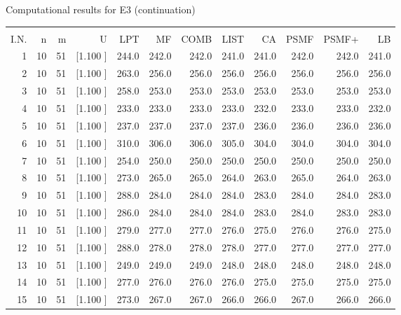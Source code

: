 \documentclass[12pt,a4paper]{article}
\begin{document}
\newpage
\begin{center}
 Computational results for E3 (continuation) {\tiny
\begin{tabular}{r r r r r r r r r r r r}\hline
    &   &   &          &        &        &        &        &        &        &        &       \\[-0.1in]
  I.N.  &  n  &  m  &  U  &  LPT  &  MF  &  COMB  &  LIST  &  CA  & PSMF &PSMF+ & LB \\[0.03in]
\hline
   1& 10& 51&[1.100     ]&   244.0&   242.0&   242.0&   241.0&   241.0&   242.0&   242.0&   241.0\\[-0.02in]
   2& 10& 51&[1.100     ]&   263.0&   256.0&   256.0&   256.0&   256.0&   256.0&   256.0&   256.0\\[-0.02in]
   3& 10& 51&[1.100     ]&   258.0&   253.0&   253.0&   253.0&   253.0&   253.0&   253.0&   253.0\\[-0.02in]
   4& 10& 51&[1.100     ]&   233.0&   233.0&   233.0&   233.0&   232.0&   233.0&   233.0&   232.0\\[-0.02in]
   5& 10& 51&[1.100     ]&   237.0&   237.0&   237.0&   237.0&   236.0&   236.0&   236.0&   236.0\\[-0.02in]
   6& 10& 51&[1.100     ]&   310.0&   306.0&   306.0&   305.0&   304.0&   304.0&   304.0&   304.0\\[-0.02in]
   7& 10& 51&[1.100     ]&   254.0&   250.0&   250.0&   250.0&   250.0&   250.0&   250.0&   250.0\\[-0.02in]
   8& 10& 51&[1.100     ]&   273.0&   265.0&   265.0&   264.0&   263.0&   265.0&   264.0&   263.0\\[-0.02in]
   9& 10& 51&[1.100     ]&   288.0&   284.0&   284.0&   284.0&   283.0&   284.0&   284.0&   283.0\\[-0.02in]
  10& 10& 51&[1.100     ]&   286.0&   284.0&   284.0&   284.0&   283.0&   284.0&   283.0&   283.0\\[-0.02in]
  11& 10& 51&[1.100     ]&   279.0&   277.0&   277.0&   276.0&   275.0&   276.0&   276.0&   275.0\\[-0.02in]
  12& 10& 51&[1.100     ]&   288.0&   278.0&   278.0&   278.0&   277.0&   277.0&   277.0&   277.0\\[-0.02in]
  13& 10& 51&[1.100     ]&   249.0&   249.0&   249.0&   248.0&   248.0&   248.0&   248.0&   248.0\\[-0.02in]
  14& 10& 51&[1.100     ]&   277.0&   276.0&   276.0&   276.0&   275.0&   275.0&   275.0&   275.0\\[-0.02in]
  15& 10& 51&[1.100     ]&   273.0&   267.0&   267.0&   266.0&   266.0&   267.0&   266.0&   266.0\\[-0.02in]

\end{tabular}}
\end{center}
\end{document}
